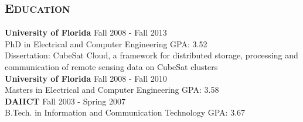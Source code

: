\begin{resume}
\section{\textsc{Education}}
\textbf{University of Florida} \hfill Fall 2008 - Fall 2013 \\
PhD in Electrical and Computer Engineering \hfill GPA: 3.52 \\
Dissertation: CubeSat Cloud, a framework for distributed storage, processing and communication of remote sensing data on CubeSat clusters\\
\textbf{University of Florida} \hfill Fall 2008 - Fall 2010 \\
Masters in Electrical and Computer Engineering \hfill GPA: 3.58 \\
\textbf{DAIICT} \hfill Fall 2003 - Spring 2007 \\
B.Tech. in Information and Communication Technology \hfill GPA: 3.67

\begin{formatb}
  \\
  \body\\
\end{formatb}


\end{resume}
